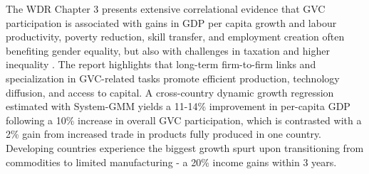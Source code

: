 \documentclass[a4paper]{article}
\begin{document}
The WDR Chapter 3 presents extensive correlational evidence that GVC participation is associated with gains in GDP per capita growth and labour productivity, poverty reduction, skill transfer, and employment creation often benefiting gender equality, but also with challenges in taxation and higher inequality \citep{world2020trading, antras2022global}. The report highlights that long-term firm-to-firm links and specialization in GVC-related tasks promote efficient production, technology diffusion, and access to capital. A cross-country dynamic growth regression estimated with System-GMM yields a 11-14\% improvement in per-capita GDP following a 10\% increase in overall GVC participation, which is contrasted with a 2\% gain from increased trade in products fully produced in one country. Developing countries experience the biggest growth spurt upon transitioning from commodities to limited manufacturing  - a 20\% income gains within 3 years. \newline
\end{document}
